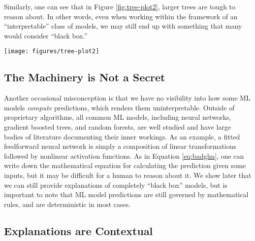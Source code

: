 \documentclass[preprint, 3p, twocolumn, letterpaper, 10pt]{elsarticle} %
\begin{document}
Similarly, one can see that in Figure \ref{fig:tree-plot2}, larger trees are
tough to reason about. In other words, even when working within the framework
of an ``interpretable'' class of models, we may still end up with something that
many would consider ``black box.''

\begin{figure*}

{\centering \texttt{[image: figures/tree-plot2]} 

}

\caption{A more complex decision tree. This is still much simpler than typical realistic examples.}\label{fig:tree-plot2}
\end{figure*}

\hypertarget{the-machinery-is-not-a-secret}{%
\subsection{The Machinery is Not a Secret}\label{the-machinery-is-not-a-secret}}

Another occasional misconception is that we have no visibility into how some ML
models \emph{compute} predictions, which renders them uninterpretable. Outside of
proprietary algorithms, all common ML models, including neural networks,
gradient boosted trees, and random forests, are well studied and have large
bodies of literature documenting their inner workings. As an example, a fitted
feedforward neural network is simply a composition of linear transformations
followed by nonlinear activation functions. As in Equation \ref{eq:badglm}, one
can write down the mathematical equation for calculating the prediction given
some inputs, but it may be difficult for a human to reason about it. We show
later that we can still provide explanations of completely ``black box'' models,
but is important to note that ML model predictions are still governed by
mathematical rules, and are deterministic in most cases.

\hypertarget{explanations-are-contextual}{%
\subsection{Explanations are Contextual}\label{explanations-are-contextual}}
\end{document}
